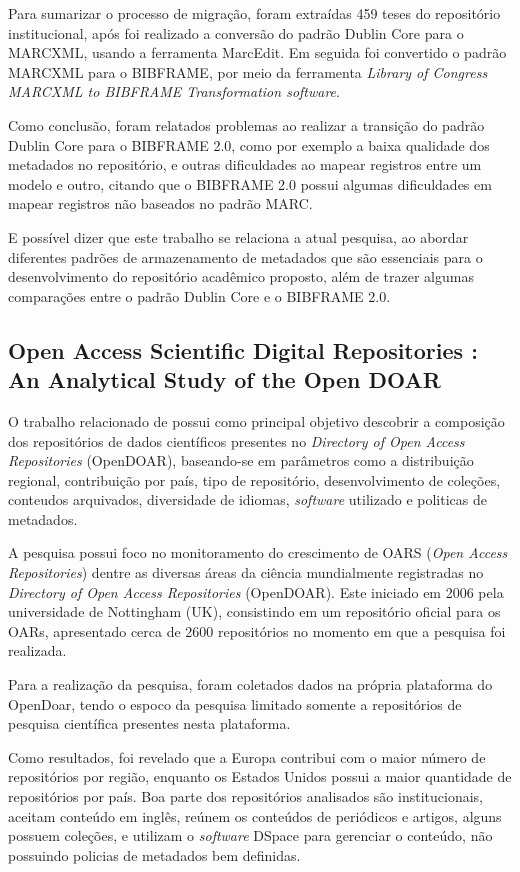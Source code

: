 Para sumarizar o processo de migração, foram extraídas 459 teses do
repositório institucional, após foi realizado a conversão do padrão
Dublin Core para o MARCXML, usando a ferramenta MarcEdit. Em seguida
foi convertido o padrão MARCXML para o BIBFRAME, por meio da ferramenta
\emph{Library of Congress MARCXML to BIBFRAME Transformation software}.

Como conclusão, foram relatados problemas ao realizar a transição do
padrão Dublin Core para o BIBFRAME 2.0, como por exemplo a baixa
qualidade dos metadados no repositório, e outras dificuldades ao
mapear registros entre um modelo e outro, citando que o BIBFRAME 2.0
possui algumas dificuldades em mapear registros não baseados no padrão
MARC.

E possível dizer que este trabalho se relaciona a atual pesquisa, ao
abordar diferentes padrões de armazenamento de metadados que são essenciais
para o desenvolvimento do repositório acadêmico proposto, além de trazer
algumas comparações entre o padrão Dublin Core e o BIBFRAME 2.0.

\subsection{Open Access Scientific Digital Repositories : An Analytical Study of the Open DOAR}

O trabalho relacionado de \cite{2018:Mufazil} possui como principal objetivo
descobrir a composição dos repositórios de dados científicos presentes no
\emph{Directory of Open Access Repositories} (OpenDOAR), baseando-se em
parâmetros como a distribuição regional, contribuição por país, tipo de
repositório, desenvolvimento de coleções, conteudos arquivados,
diversidade de idiomas, \emph{software} utilizado e politicas de metadados.

A pesquisa possui foco no monitoramento do crescimento de OARS
(\emph{Open Access Repositories}) dentre as diversas áreas da ciência
mundialmente registradas no \emph{Directory of Open Access Repositories} (OpenDOAR).
Este iniciado em 2006 pela universidade de Nottingham (UK), consistindo
em um repositório oficial para os OARs, apresentado cerca de 2600 repositórios
no momento em que a pesquisa foi realizada.

Para a realização da pesquisa, foram coletados dados na própria plataforma
do OpenDoar, tendo o espoco da pesquisa limitado somente a repositórios
de pesquisa científica presentes nesta plataforma.

Como resultados, foi revelado que a Europa contribui com o maior número
de repositórios por região, enquanto os Estados Unidos possui a maior
quantidade de repositórios por país. Boa parte dos repositórios analisados
são institucionais, aceitam conteúdo em inglês, reúnem os conteúdos de
periódicos e artigos, alguns possuem coleções, e utilizam o \emph{software}
DSpace para gerenciar o conteúdo, não possuindo policias de metadados
bem definidas.

